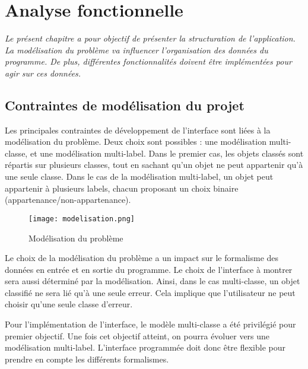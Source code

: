 \chapter[Analyse fonctionnelle]{Analyse fonctionnelle}

\textit{Le présent chapitre a pour objectif de présenter la structuration de l'application. La modélisation du problème va influencer l'organisation des données du programme. De plus, différentes fonctionnalités doivent être implémentées pour agir sur ces données.}

\section{Contraintes de modélisation du projet}

Les principales contraintes de développement de l’interface sont liées à la modélisation du problème. Deux choix sont possibles : une modélisation multi-classe, et une modélisation multi-label. Dans le premier cas, les objets classés sont répartis sur plusieurs classes, tout en sachant qu’un objet ne peut appartenir qu'à une seule classe. Dans le cas de la modélisation multi-label, un objet peut appartenir à plusieurs labels, chacun proposant un choix binaire (appartenance/non-appartenance).\newline

\begin{figure}[!h]
	\begin{center}
		\texttt{[image: modelisation.png]}  \\
		\caption[Modélisation du problème]{Modélisation du problème}
		\label{fig:modelisation}
	\end{center}
\end{figure}

Le choix de la modélisation du problème a un impact sur le formalisme des données en entrée et en sortie du programme. Le choix de l’interface à montrer sera aussi déterminé par la modélisation. Ainsi, dans le cas multi-classe, un objet classifié ne sera lié qu’à une seule erreur. Cela implique que l'utilisateur ne peut choisir qu'une seule classe d'erreur. \newline

Pour l'implémentation de l’interface, le modèle multi-classe a été privilégié pour premier objectif. Une fois cet objectif atteint, on pourra évoluer vers une modélisation multi-label. L’interface programmée doit donc être flexible pour prendre en compte les différents formalismes. \newline

